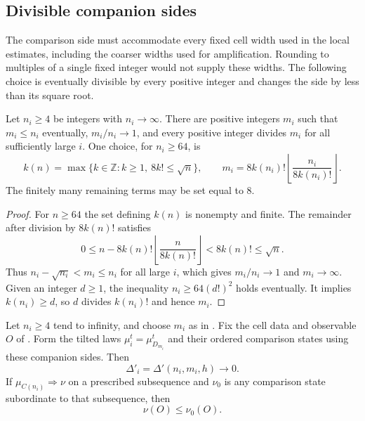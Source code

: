 \documentclass[11pt,letterpaper,reqno]{amsart}
\newcommand{\Z}{\mathbb Z}
\begin{document}
\subsection{Divisible companion sides}\label{sec:companion-sequences}

The comparison side must accommodate every fixed cell width used in
the local estimates, including the coarser widths used for
amplification. Rounding to multiples of a single fixed integer would
not supply these widths. The following choice is eventually divisible
by every positive integer and changes the side by less than its square
root.

\begin{lemma}\label{lem:companions-exist}
Let $n_i\ge4$ be integers with $n_i\to\infty$. There are positive
integers $m_i$ such that $m_i\le n_i$ eventually, $m_i/n_i\to1$,
and every positive integer divides $m_i$ for all sufficiently large
$i$. One choice, for $n_i\ge64$, is
\[
 k(n)=\max\{k\in\Z:k\ge1,\ 8k!\le\sqrt n\},\qquad
 m_i=8k(n_i)!\left\lfloor\frac{n_i}{8k(n_i)!}\right\rfloor.
\]
The finitely many remaining terms may be set equal to $8$.
\end{lemma}

\begin{proof}
For $n\ge64$ the set defining $k(n)$ is nonempty and finite.
The remainder after division by $8k(n)!$ satisfies
\[
 0\le n-8k(n)!\left\lfloor\frac n{8k(n)!}\right\rfloor
       <8k(n)!\le\sqrt n.
\]
Thus $n_i-\sqrt{n_i}<m_i\le n_i$ for all large $i$, which gives
$m_i/n_i\to1$ and $m_i\to\infty$. Given an integer $d\ge1$,
the inequality $n_i\ge64(d!)^2$ holds eventually. It implies
$k(n_i)\ge d$, so $d$ divides $k(n_i)!$ and hence $m_i$.
\end{proof}

\begin{proposition}
\label{thm:comparison-any-side}
Let $n_i\ge4$ tend to infinity, and choose $m_i$ as in
. Fix the cell data and observable
$O$ of . Form the tilted laws
$\mu_i^t=\mu_{D_{m_i}}^t$ and their ordered comparison states using
these companion sides. Then
\[
 \Delta'_i=\Delta'(n_i,m_i,h)\longrightarrow0.
\]
If $\mu_{C(n_i)}\Rightarrow\nu$ on a prescribed subsequence and
$\nu_0$ is any comparison state subordinate to that subsequence,
then
\begin{equation}\label{eq:sides-limit-comparison}
 \nu(O)\le\nu_0(O).
\end{equation}
\end{proposition}
\end{document}
